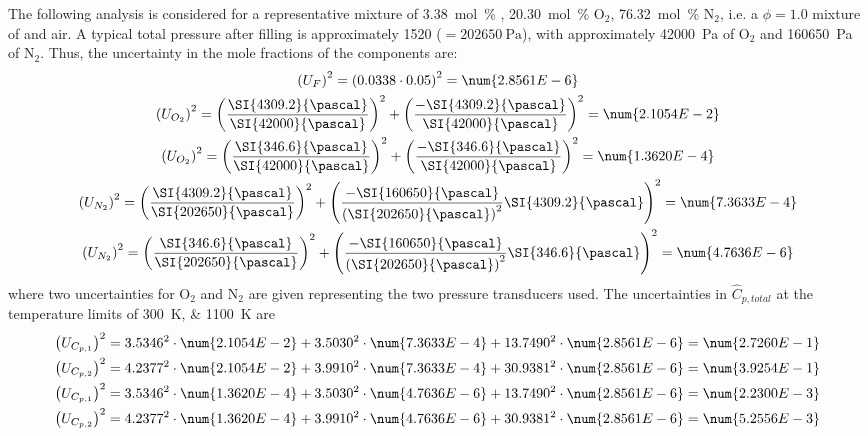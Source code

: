 \documentclass[../main.tex]{subfiles}
\begin{document}
The following analysis is considered for a representative mixture of
\SI{3.38}{\mole\percent} \tBuOH{}, \SI{20.30}{\mol\percent} O$_2$,
\SI{76.32}{\mole\percent} N$_2$, i.e. a $\phi=1.0$ mixture of \tBuOH{}
and air. A typical total pressure after filling is approximately
\SI{1520}{\torr} ($=\SI{202650}{\pascal}$), with approximately
\SI{42000}{\pascal} of O$_2$ and \SI{160650}{\pascal} of N$_2$. Thus,
the uncertainty in the mole fractions of the components are:
%
\begin{gather*}
\left(U_F\right)^2 = \left(0.0338 \cdot 0.05\right)^2 = \num{2.8561E-6} \\
\left(U_{O_2}\right)^2 = \left(\frac{\SI{4309.2}{\pascal}}{\SI{42000}{\pascal}}\right)^2 + \left(\frac{-\SI{4309.2}{\pascal}}{\SI{42000}{\pascal}}\right)^2 = \num{2.1054E-2} \\
\left(U_{O_2}\right)^2 = \left(\frac{\SI{ 346.6}{\pascal}}{\SI{42000}{\pascal}}\right)^2 + \left(\frac{-\SI{ 346.6}{\pascal}}{\SI{42000}{\pascal}}\right)^2 = \num{1.3620E-4} \\
\left(U_{N_2}\right)^2 = \left(\frac{\SI{4309.2}{\pascal}}{\SI{202650}{\pascal}}\right)^2 + \left(\frac{-\SI{160650}{\pascal}}{\left(\SI{202650}{\pascal}\right)^2}\SI{4309.2}{\pascal}\right)^2 = \num{7.3633E-4} \\
\left(U_{N_2}\right)^2 = \left(\frac{\SI{346.6}{\pascal}}{\SI{202650}{\pascal}}\right)^2 + \left(\frac{-\SI{160650}{\pascal}}{\left(\SI{202650}{\pascal}\right)^2}\SI{346.6}{\pascal}\right)^2 = \num{4.7636E-6}
\end{gather*}
%
where two uncertainties for O$_2$ and N$_2$ are given representing the two
pressure transducers used. The uncertainties in $\hat{C}_{p,total}$ at
the temperature limits of \SIlist{300;1100}{\kelvin} are
%
\begin{gather*}
\left(U_{C_{p,1}}\right)^2 = 3.5346^2 \cdot \num{2.1054E-2} + 3.5030^2 \cdot \num{7.3633E-4} + 13.7490^2 \cdot \num{2.8561E-6} = \num{2.7260E-1} \\
\left(U_{C_{p,2}}\right)^2 = 4.2377^2 \cdot \num{2.1054E-2} + 3.9910^2 \cdot \num{7.3633E-4} + 30.9381^2 \cdot \num{2.8561E-6} = \num{3.9254E-1} \\
\left(U_{C_{p,1}}\right)^2 = 3.5346^2 \cdot \num{1.3620E-4} + 3.5030^2 \cdot \num{4.7636E-6} + 13.7490^2 \cdot \num{2.8561E-6} = \num{2.2300E-3} \\
\left(U_{C_{p,2}}\right)^2 = 4.2377^2 \cdot \num{1.3620E-4} + 3.9910^2 \cdot \num{4.7636E-6} + 30.9381^2 \cdot \num{2.8561E-6} = \num{5.2556E-3}
\end{gather*}
\end{document}
